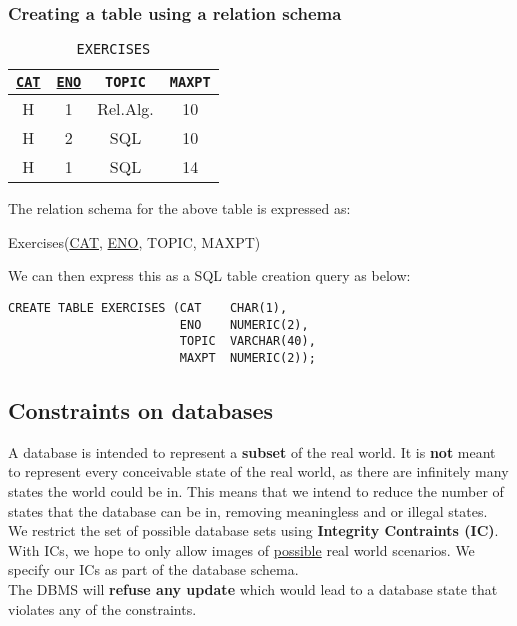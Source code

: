\documentclass{article}
\begin{document}
\subsubsection*{Creating a table using a relation schema}
\begin{table}[H]
\begin{center}
 \begin{tabular}{| c | c | c | c |} 
 \hline
 \underline{\texttt{CAT}} & \underline{\texttt{ENO}} & \texttt{TOPIC} & \texttt{MAXPT} \\ [0.5ex] 
 \hline
 H & 1 & Rel.Alg. & 10 \\
 H & 2 & SQL & 10 \\
 H & 1 & SQL & 14 \\
 \hline
\end{tabular}
\end{center}
\caption{\texttt{EXERCISES}}
\end{table}
The relation schema for the above table is expressed as:
\begin{center}
    Exercises(\underline{CAT}, \underline{ENO}, TOPIC, MAXPT)
\end{center}
We can then express this as a SQL table creation query as below:
\begin{lstlisting}
CREATE TABLE EXERCISES (CAT    CHAR(1),
                        ENO    NUMERIC(2),
                        TOPIC  VARCHAR(40),
                        MAXPT  NUMERIC(2));
\end{lstlisting}

\subsection*{Constraints on databases}
A database is intended to represent a \textbf{subset} of the real world. It is \textbf{not} meant to represent every conceivable state of the real world, as there are infinitely many states the world could be in. This means that we intend to reduce the number of states that the database can be in, removing meaningless and or illegal states.
\\We restrict the set of possible database sets using \textbf{Integrity Contraints (IC)}. With ICs, we hope to only allow images of \underline{possible} real world scenarios. We specify our ICs as part of the database schema.
\\The DBMS will \textbf{refuse any update} which would lead to a database state that violates any of the constraints.
\end{document}
